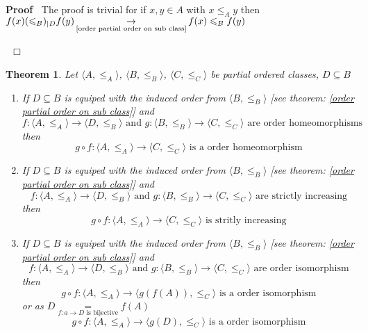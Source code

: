 \documentclass{book}
\newcommand{\Rightarrowlim}{\mathop{\rightarrow}\limits}
\newcommand{\equallim}{\mathop{=}\limits}
\newenvironment{proof}{\noindent\textbf{Proof\ }}{\hspace*{\fill}$\Box$\medskip}
\newtheorem{theorem}{Theorem}
\begin{document}
\begin{proof}
  The proof is trivial for if $x, y \in A$ with $x \leqslant_A y$ then $f (x)
  (\leqslant_B)_{|D} f (y) \Rightarrowlim_{\text{\ref{order partial order on
  sub class}}} f (x) \leqslant_B f (y)$
  
  \ 
\end{proof}

\begin{theorem}
  \label{order composition of functions}Let $\langle A, \leqslant_A \rangle$,
  $\langle B, \leqslant_B \rangle$, $\langle C, \leqslant_C \rangle$ be
  partial ordered classes, $D \subseteq B$
  \begin{enumerate}
    \item If $D \subseteq B$ is equiped with the induced order from $\langle
    B, \leqslant_B \rangle$ [see theorem: \ref{order partial order on sub
    class}] and
    \[ f : \langle A, \leqslant_A \rangle \rightarrow \langle D, \leqslant_B
       \rangle \text{ and } g : \langle B, \leqslant_B \rangle \rightarrow
       \langle C, \leqslant_C \rangle \text{ are order homeomorphisms} \]
    then
    \[ g \circ f : \langle A, \leqslant_A \rangle \rightarrow \langle C,
       \leqslant_C \rangle \text{ is a order homeomorphism} \]
    \item If $D \subseteq B$ is equiped with the induced order from $\langle
    B, \leqslant_B \rangle$ [see theorem: \ref{order partial order on sub
    class}] and
    \[ f : \langle A, \leqslant_A \rangle \rightarrow \langle D, \leqslant_B
       \rangle \text{ and } g : \langle B, \leqslant_B \rangle \rightarrow
       \langle C, \leqslant_C \rangle \text{ are strictly increasing} \]
    then
    \[ g \circ f : \langle A, \leqslant_A \rangle \rightarrow \langle C,
       \leqslant_C \rangle \text{ is stritly increasing} \]
    \item If $D \subseteq B$ is equiped with the induced order from $\langle
    B, \leqslant_B \rangle$ [see theorem: \ref{order partial order on sub
    class}] and
    \[ f : \langle A, \leqslant_A \rangle \rightarrow \langle D, \leqslant_B
       \rangle \text{ and } g : \langle B, \leqslant_B \rangle \rightarrow
       \langle C, \leqslant_C \rangle \text{ are order isomorphism} \]
    then
    \[ g \circ f : \langle A, \leqslant_A \rangle \rightarrow \langle g (f
       (A)), \leqslant_C \rangle \text{ is a order isomorphism} \]
    or as $D \equallim_{f : a \rightarrow D \text{ is bijective}} f (A)$
    \[ g \circ f : \langle A, \leqslant_A \rangle \rightarrow \langle g (D),
       \leqslant_C \rangle \text{ is a order isomorphism} \]
  \end{enumerate}
\end{theorem}
\end{document}
